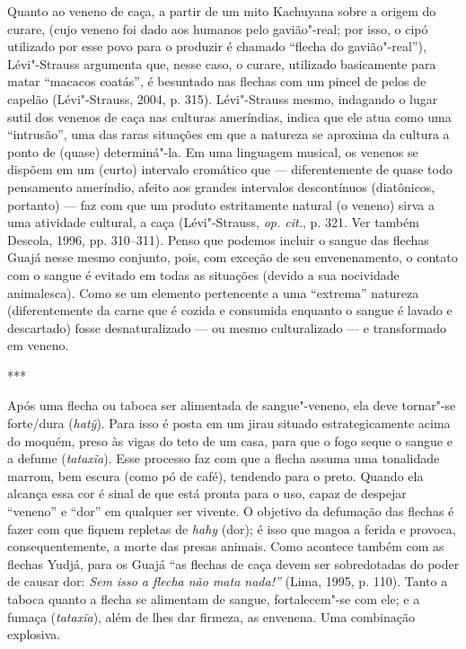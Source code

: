 Quanto ao veneno de caça, a partir de um mito Kachuyana sobre a origem
do curare, (cujo veneno foi dado aos humanos pelo gavião"-real; por isso,
o cipó utilizado por esse povo para o produzir é chamado ``flecha do
gavião"-real''), Lévi"-Strauss argumenta que, nesse caso, o curare,
utilizado basicamente para matar ``macacos coatás'', é besuntado nas
flechas com um pincel de pelos de capelão (Lévi"-Strauss, 2004, p. 315).
Lévi"-Strauss mesmo, indagando o lugar sutil dos venenos de caça nas
culturas ameríndias, indica que ele atua como uma ``intrusão'', uma das
raras situações em que a natureza se aproxima da cultura a ponto de
(quase) determiná"-la. Em uma linguagem musical, os venenos se dispõem em
um (curto) intervalo cromático que --- diferentemente de quase todo
pensamento ameríndio, afeito aos grandes intervalos descontínuos
(diatônicos, portanto) --- faz com que um produto estritamente natural (o
veneno) sirva a uma atividade cultural, a caça (Lévi"-Strauss, \emph{op. cit.},
p. 321. Ver também Descola, 1996, pp. 310--311). Penso que podemos incluir
o sangue das flechas Guajá nesse mesmo conjunto, pois, com exceção de
seu envenenamento, o contato com o sangue é evitado em todas as
situações (devido a sua nocividade animalesca). Como se um elemento
pertencente a uma ``extrema'' natureza (diferentemente da carne que é
cozida e consumida enquanto o sangue é lavado e descartado) fosse
desnaturalizado --- ou mesmo culturalizado --- e transformado em veneno.

\begin{center}
***
\end{center}

Após uma flecha ou taboca ser alimentada de sangue"-veneno, ela deve
tornar"-se forte/dura (\emph{hatỹ}). Para isso é posta em um jirau
situado estrategicamente acima do moquém, preso às vigas do teto de um
casa, para que o fogo seque o sangue e a defume (\emph{tataxĩa}). Esse
processo faz com que a flecha assuma uma tonalidade marrom, bem escura
(como pó de café), tendendo para o preto. Quando ela alcança essa cor é
sinal de que está pronta para o uso, capaz de despejar ``veneno'' e ``dor''
em qualquer ser vivente. O objetivo da defumação das flechas é fazer com
que fiquem repletas de \emph{hahy} (dor); é isso que magoa a ferida e
provoca, consequentemente, a morte das presas animais. Como acontece
também com as flechas Yudjá, para os Guajá ``as flechas de caça devem
ser sobredotadas do poder de causar dor: \emph{Sem isso a flecha não
mata nada!''} (Lima, 1995, p. 110). Tanto a taboca quanto a flecha se
alimentam de sangue, fortalecem"-se com ele; e a fumaça (\emph{tataxĩa}),
além de lhes dar firmeza, as envenena. Uma combinação explosiva.

